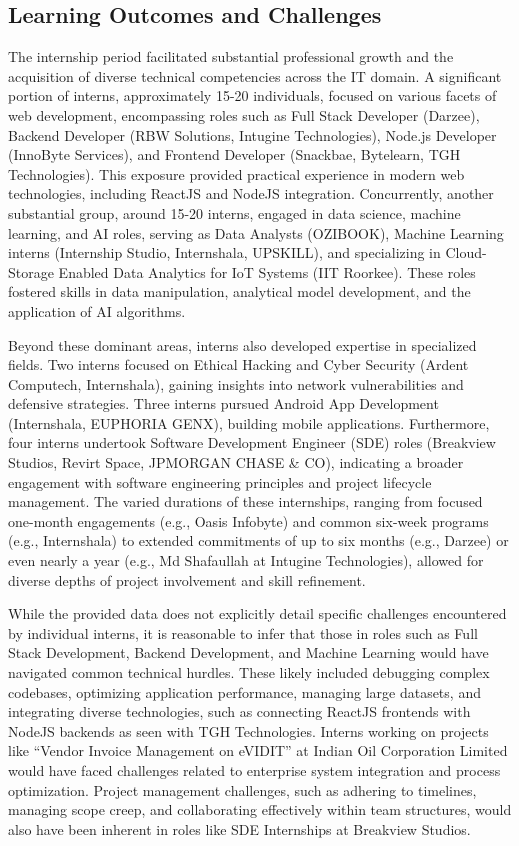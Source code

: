 \documentclass[11pt,a4paper]{article}
\newenvironment{card}{
    \begin{tcolorbox}[
        enhanced,
        colback=cardback,
        colframe=border,
        sharp corners,
        boxrule=0.5pt,
        drop shadow,
        shadow xshift=1mm,
        shadow yshift=-1mm,
        shadow color=border!50,
        boxsep=3mm,
        left=5mm, right=5mm, top=5mm, bottom=5mm,
        width=\textwidth,
        nobeforeafter
    ]
}{\end{tcolorbox}}
\begin{document}
\begin{card}
    \subsection*{\textcolor{accent}{Learning Outcomes and Challenges}}
    \vspace{0.3cm}
    The internship period facilitated substantial professional growth and the acquisition of diverse technical competencies across the IT domain. A significant portion of interns, approximately 15-20 individuals, focused on various facets of web development, encompassing roles such as Full Stack Developer (Darzee), Backend Developer (RBW Solutions, Intugine Technologies), Node.js Developer (InnoByte Services), and Frontend Developer (Snackbae, Bytelearn, TGH Technologies). This exposure provided practical experience in modern web technologies, including ReactJS and NodeJS integration. Concurrently, another substantial group, around 15-20 interns, engaged in data science, machine learning, and AI roles, serving as Data Analysts (OZIBOOK), Machine Learning interns (Internship Studio, Internshala, UPSKILL), and specializing in Cloud-Storage Enabled Data Analytics for IoT Systems (IIT Roorkee). These roles fostered skills in data manipulation, analytical model development, and the application of AI algorithms.

    Beyond these dominant areas, interns also developed expertise in specialized fields. Two interns focused on Ethical Hacking and Cyber Security (Ardent Computech, Internshala), gaining insights into network vulnerabilities and defensive strategies. Three interns pursued Android App Development (Internshala, EUPHORIA GENX), building mobile applications. Furthermore, four interns undertook Software Development Engineer (SDE) roles (Breakview Studios, Revirt Space, JPMORGAN CHASE \& CO), indicating a broader engagement with software engineering principles and project lifecycle management. The varied durations of these internships, ranging from focused one-month engagements (e.g., Oasis Infobyte) and common six-week programs (e.g., Internshala) to extended commitments of up to six months (e.g., Darzee) or even nearly a year (e.g., Md Shafaullah at Intugine Technologies), allowed for diverse depths of project involvement and skill refinement.

    While the provided data does not explicitly detail specific challenges encountered by individual interns, it is reasonable to infer that those in roles such as Full Stack Development, Backend Development, and Machine Learning would have navigated common technical hurdles. These likely included debugging complex codebases, optimizing application performance, managing large datasets, and integrating diverse technologies, such as connecting ReactJS frontends with NodeJS backends as seen with TGH Technologies. Interns working on projects like ``Vendor Invoice Management on eVIDIT'' at Indian Oil Corporation Limited would have faced challenges related to enterprise system integration and process optimization. Project management challenges, such as adhering to timelines, managing scope creep, and collaborating effectively within team structures, would also have been inherent in roles like SDE Internships at Breakview Studios.


\end{card}
\end{document}

